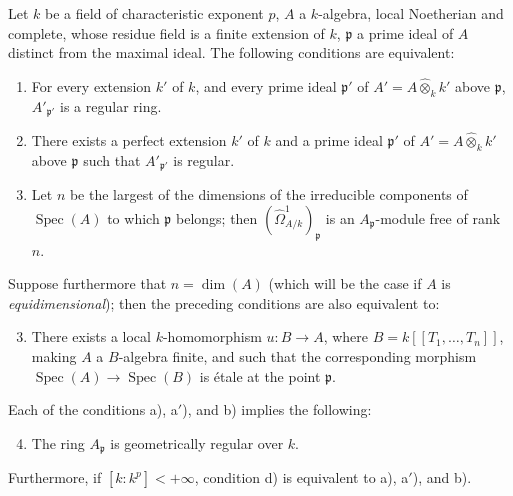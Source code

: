 \begin{theorem}[18.11.10]
\label{IV.18.11.10}
Let $k$ be a field of characteristic exponent $p$, $A$ a $k$-algebra, local Noetherian and complete, whose residue field is a finite extension of $k$, $\mathfrak{p}$ a prime ideal of $A$ distinct from the maximal ideal.
The following conditions are equivalent:
\begin{enumerate}[label=\emph{\alph*)}]
  \item For every extension $k'$ of $k$, and every prime ideal $\mathfrak{p}'$ of $A'=A\widehat{\otimes}_kk'$ above $\mathfrak{p}$, $A'_{\mathfrak{p}'}$ is a regular ring.
\item[\textup{a$'$)}] There exists a \textup{perfect} extension $k'$ of $k$ and a prime ideal $\mathfrak{p}'$ of $A'=A\widehat{\otimes}_kk'$ above $\mathfrak{p}$ such that $A'_{\mathfrak{p}'}$ is regular.
  \item Let $n$ be the largest of the dimensions of the irreducible components of $\operatorname{Spec}(A)$ to which $\mathfrak{p}$ belongs; then $(\hat{\Omega}^1_{A/k})_\mathfrak{p}$ is an $A_\mathfrak{p}$-module free of rank $n$.
\end{enumerate}
Suppose furthermore that $n=\dim(A)$ \textup{(which will be the case if $A$ is \emph{equidimensional})}; then the preceding conditions are also equivalent to:
\begin{enumerate}[label=\emph{\alph*)}]
  \setcounter{enumi}{2}
  \item There exists a local $k$-homomorphism $u:B\to A$, where $B=k[[T_1,\ldots,T_n]]$, making $A$ a $B$-algebra finite, and such that the corresponding morphism $\operatorname{Spec}(A)\to\operatorname{Spec}(B)$ is \'etale at the point $\mathfrak{p}$.
\end{enumerate}
Each of the conditions \textup{a)}, \textup{a$'$)}, and \textup{b)} implies the following:
\begin{enumerate}[label=\emph{\alph*)}]
  \setcounter{enumi}{3}
  \item The ring $A_\mathfrak{p}$ is geometrically regular over $k$.
\end{enumerate}
Furthermore, if $[k:k^p]<+\infty$, condition \textup{d)} is equivalent to \textup{a)}, \textup{a$'$)}, and \textup{b)}.
\end{theorem}

